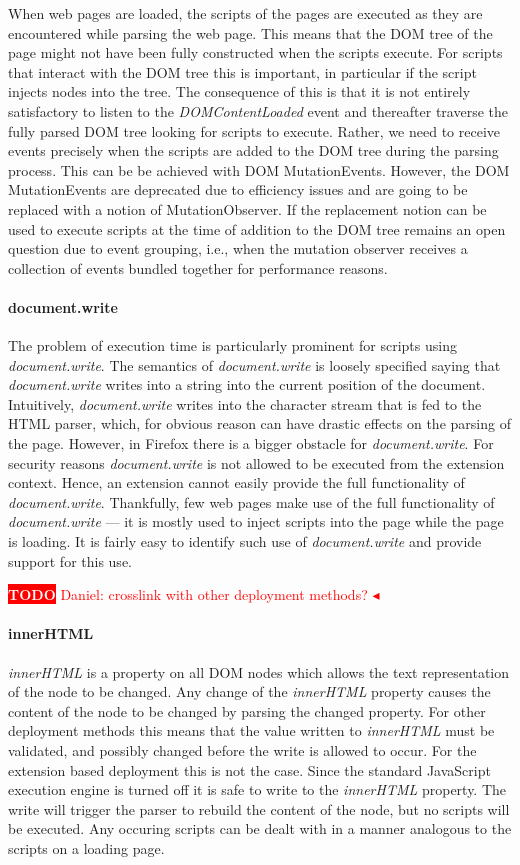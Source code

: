 \documentclass{llncs}
\newcommand{\todo}[1]{\colorbox{red}{\textcolor{white}{\sffamily\bfseries\scriptsize TODO}} \textcolor{red}{#1} \textcolor{red}{$\blacktriangleleft$}}
\begin{document}
When web pages are loaded, the scripts of the pages are executed as they are
encountered while parsing the web page. This means that the DOM tree of the
page might not have been fully constructed when the scripts execute.  For
scripts that interact with the DOM tree this is important, in particular if the
script injects nodes into the tree. The consequence of this is that it is not
entirely satisfactory to listen to the \emph{DOMContentLoaded} event and
thereafter traverse the fully parsed DOM tree looking for scripts to execute.
Rather, we need to receive events precisely when the scripts are added to the
DOM tree during the parsing process. This can be be achieved with DOM
MutationEvents. However, the DOM MutationEvents are deprecated due to
efficiency issues and are going to be replaced with a notion of
MutationObserver.  If the replacement notion can be used to execute scripts at
the time of addition to the DOM tree remains an open question due to event
grouping, i.e., when the mutation observer receives a collection of events
bundled together for performance reasons. 


\paragraph{document.write} The problem of execution time is particularly
prominent for scripts using \emph{document.write}. The semantics of
\emph{document.write} is loosely specified saying that \emph{document.write}
writes into a string into the current position of the document.  Intuitively,
\emph{document.write} writes into the character stream that is fed to the HTML
parser, which, for obvious reason can have drastic effects on the parsing of
the page.  However, in Firefox there is a bigger obstacle for
\emph{document.write}. For security reasons \emph{document.write} is not
allowed to be executed from the extension context.  Hence, an extension cannot
easily provide the full functionality of \emph{document.write}.  Thankfully,
few web pages make use of the full functionality of \emph{document.write} ---
it is mostly used to inject scripts into the page while the page is loading. It
is fairly easy to identify such use of \emph{document.write} and provide
support for this use.


\todo{Daniel: crosslink with other deployment methods?} \paragraph{innerHTML}
%
\emph{innerHTML} is a property on all DOM nodes which allows the text
representation of the node to be changed. Any change of the \emph{innerHTML}
property causes the content of the node to be changed by parsing the changed
property. For other deployment methods this means that the value written to
\emph{innerHTML} must be validated, and possibly changed before the write is
allowed to occur.  For the extension based deployment this is not the case.
Since the standard JavaScript execution engine is turned off it is safe to
write to the \emph{innerHTML} property. The write will trigger the parser to
rebuild the content of the node, but no scripts will be executed.  Any occuring
scripts can be dealt with in a manner analogous to the scripts on a loading
page.
\end{document}

